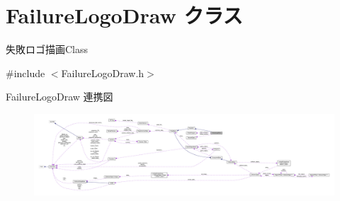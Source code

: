 \hypertarget{class_failure_logo_draw}{}\section{Failure\+Logo\+Draw クラス}
\label{class_failure_logo_draw}


失敗ロゴ描画\+Class  




{\ttfamily \#include $<$Failure\+Logo\+Draw.\+h$>$}



Failure\+Logo\+Draw 連携図\nopagebreak
\begin{figure}[H]
\begin{center}
\leavevmode
\includegraphics[width=350pt]{class_failure_logo_draw__coll__graph}
\end{center}
\end{figure}
